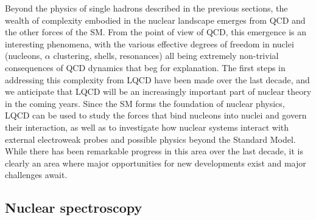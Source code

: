 
 Beyond the physics of single hadrons described in the previous sections, the wealth of complexity embodied in the nuclear landscape emerges from QCD and the other forces of the SM.  From the point of view of QCD, this emergence is an interesting phenomena, with the various effective degrees of freedom in nuclei (nucleons, $\alpha$ clustering, shells, resonances) all being extremely non-trivial consequences of QCD dynamics that beg for explanation. The first steps in addressing this complexity from LQCD have been made over the last decade, and we anticipate that LQCD will be an increasingly important part of nuclear theory in the coming years. Since the SM forms the foundation of nuclear physics, LQCD can be used to study the forces that bind nucleons into nuclei and govern their interaction, as well as to investigate how nuclear systems interact with external electroweak probes and possible physics beyond the Standard Model.
While there has been remarkable progress in this area over the last decade, it is clearly an area where major opportunities for new developments exist and major challenges await.

\subsection{Nuclear spectroscopy}

